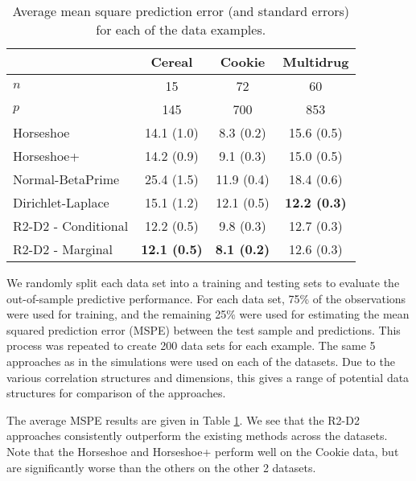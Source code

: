 \documentclass[12pt]{article}
\begin{document}
\begin{table}[htbp]
	\centering
		\renewcommand{\arraystretch}{1.2}
	\begin{tabular}{|l|c|c|c|}
		\hline
		& Cereal & Cookie & Multidrug \\
		\hline
		$n$ & 15 & 72 & 60 \\
		$p$ & 145 & 700 & 853 \\
		\hline
		Horseshoe  & 14.1 (1.0) & 8.3 (0.2)& 15.6 (0.5) \\
		\hline
		Horseshoe+ & 14.2 (0.9) & 9.1 (0.3)  & 15.0 (0.5) \\
		\hline
		Normal-BetaPrime & 25.4 (1.5) & 11.9 (0.4)  & 18.4 (0.6) \\
		\hline
		Dirichlet-Laplace & 15.1 (1.2) & 12.1 (0.5)  & \textbf{12.2 (0.3)} \\
		\hline
		R2-D2 - Conditional & 12.2 (0.5) & 9.8 (0.3)  & 12.7 (0.3) \\
		\hline
		R2-D2 - Marginal & \textbf{12.1 (0.5)} & \textbf{8.1 (0.2)} & 12.6 (0.3) \\
		\hline
	\end{tabular}
	\caption{Average mean square prediction error (and standard errors) for each of the data examples.}
	\label{table-real}
\end{table}


We randomly split each data set into a training and testing sets to evaluate the out-of-sample predictive performance.
For each data set, 75\% of the observations were used for training, and the remaining 25\% were used for estimating the mean squared prediction error (MSPE) between the test sample and predictions.
This process was repeated to create 200 data sets for each example.
The same 5 approaches as in the simulations were used on each of the datasets. Due to the various correlation structures and dimensions, this gives a range of potential data structures for comparison of the approaches.

The average MSPE results are given in Table \ref{table-real}. We see that the R2-D2 approaches consistently outperform the existing methods across the datasets. Note that the Horseshoe and Horseshoe+ perform well on the Cookie data, but are significantly worse than the others on the other 2 datasets.







\end{document}
